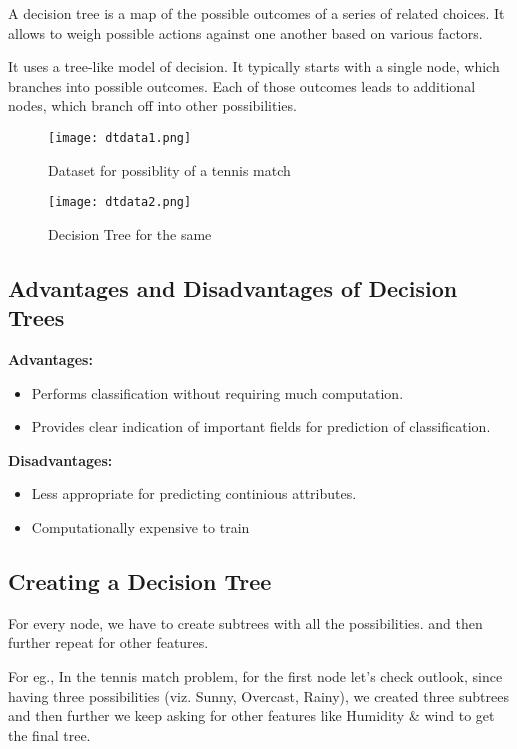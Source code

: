 A decision tree is a map of the possible outcomes of a series of related choices. It allows to weigh possible actions against one another based on various factors.\par
It uses a tree-like model of decision. It typically starts with a single node, which branches into possible outcomes. Each of those outcomes leads to additional nodes, which branch off into other possibilities. 

\begin{figure}[h]
    \centering
    \texttt{[image: dtdata1.png]}
    \caption{Dataset for possiblity of a tennis match}
    \texttt{[image: dtdata2.png]}
    \caption{Decision Tree for the same}
\end{figure}

\subsection{Advantages and Disadvantages of Decision Trees}
    \textbf{Advantages:}
    \begin{itemize}
        \item Performs classification without requiring much computation.
        \item Provides clear indication of important fields for prediction of classification.
    \end{itemize}
    \vspace{15mm}
    \textbf{Disadvantages:}
    \begin{itemize}
        \item Less appropriate for predicting continious attributes.
        \item Computationally expensive to train
    \end{itemize}

\vspace{5mm}
\subsection{Creating a Decision Tree}
    For every node, we have to create subtrees with all the possibilities. and then further repeat for other features.\par
    For eg., In the tennis match problem, for the first node let's check outlook, since having three possibilities (viz. Sunny, Overcast, Rainy), we created three subtrees and then further we keep asking for other features like Humidity \& wind to get the final tree.  

